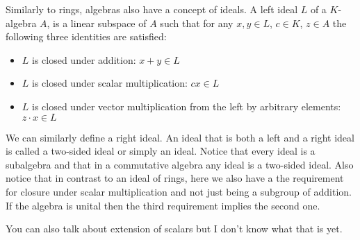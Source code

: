 \documentclass[11pt,a4paper]{article}
\theoremstyle{definition}
\theoremstyle{plain}
\begin{document}
  Similarly to rings, algebras also have a concept of ideals. A left ideal
  $L$ of a $K$-algebra $A$, is a linear subspace of $A$ such that for
  any $x,y \in L$, $c \in K$, $z \in A$ the following three identities
  are satisfied:
  \begin{itemize}
    \item $L$ is closed under addition: $x + y \in L$
    \item $L$ is closed under scalar multiplication: $cx \in L$
    \item $L$ is closed under vector multiplication from the left
    by arbitrary elements: $z \cdot x \in L$
  \end{itemize}
  We can similarly define a right ideal. An ideal that is both a left and
  a right ideal is called a two-sided ideal or simply an ideal. Notice
  that every ideal is a subalgebra and that in a commutative algebra
  any ideal is a two-sided ideal. Also notice that in contrast to an
  ideal of rings, here we also have a the requirement for closure under
  scalar multiplication and not just being a subgroup of addition.
  If the algebra is unital then the third requirement implies the second
  one.

  You can also talk about extension of scalars but I don't know what
  that is yet.
\end{document}
